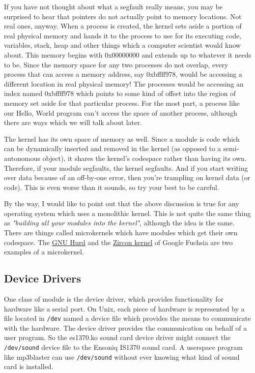 \documentclass[10pt, oneside]{book}
\begin{document}
If you have not thought about what a segfault really means, you may be surprised to hear that pointers do not actually point to memory locations.
Not real ones, anyway.
When a process is created, the kernel sets aside a portion of real physical memory and hands it to the process to use for its executing code, variables, stack, heap and other things which a computer scientist would know about.
This memory begins with 0x00000000 and extends up to whatever it needs to be.
Since the memory space for any two processes do not overlap, every process that can access a memory address, say 0xbffff978, would be accessing a different location in real physical memory! The processes would be accessing an index named 0xbffff978 which points to some kind of offset into the region of memory set aside for that particular process.
For the most part, a process like our Hello, World program can't access the space of another process, although there are ways which we will talk about later.

The kernel has its own space of memory as well. Since a module is code which can be dynamically inserted and removed in the kernel (as opposed to a semi-autonomous object), it shares the kernel's codespace rather than having its own.
Therefore, if your module segfaults, the kernel segfaults.
And if you start writing over data because of an off-by-one error, then you're trampling on kernel data (or code).
This is even worse than it sounds, so try your best to be careful.

By the way, I would like to point out that the above discussion is true for any operating system which uses a monolithic kernel.
This is not quite the same thing as \emph{"building all your modules into the kernel"}, although the idea is the same.
There are things called microkernels which have modules which get their own codespace.
The \href{https://www.gnu.org/software/hurd/}{GNU Hurd} and the \href{https://fuchsia.dev/fuchsia-src/concepts/kernel}{Zircon kernel} of Google Fuchsia are two examples of a microkernel.

\subsection{Device Drivers}
\label{sec:device_drivers}
One class of module is the device driver, which provides functionality for hardware like a serial port.
On Unix, each piece of hardware is represented by a file located in \verb|/dev| named a device file which provides the means to communicate with the hardware.
The device driver provides the communication on behalf of a user program.
So the es1370.ko sound card device driver might connect the \verb|/dev/sound| device file to the Ensoniq IS1370 sound card.
A userspace program like mp3blaster can use \verb|/dev/sound| without ever knowing what kind of sound card is installed.
\end{document}

